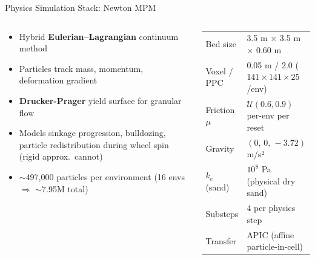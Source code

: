 \documentclass[aspectratio=169, 10pt]{beamer}
\newcommand{\keyword}[1]{\textbf{\color{MarsLight}#1}}
\newcommand{\teal}[1]{{\color{ArcticTeal}#1}}
\begin{document}
\begin{frame}{Physics Simulation Stack: Newton MPM}
\begin{columns}[T]
\begin{tcolorbox}[mycard, title={\faAtom\; Material Point Method (MPM)}]
  \scriptsize
  \begin{itemize}[leftmargin=1em, itemsep=2pt]
    \item Hybrid \keyword{Eulerian–Lagrangian} continuum method
    \item Particles track mass, momentum, deformation gradient
    \item \keyword{Drucker-Prager} yield surface for granular flow
    \item Models sinkage progression, bulldozing, particle
      redistribution during wheel spin (rigid approx.\ cannot)
    \item \teal{$\sim$497,000 particles per environment} (16 envs $\Rightarrow$ $\sim$7.95M total)
  \end{itemize}
\end{tcolorbox}

\vspace{-0.7em}
\begin{tcolorbox}[mycard, title={\faCubes\; Sand Bed Configuration}]
  \scriptsize
  \setlength{\tabcolsep}{3pt}\renewcommand{\arraystretch}{0.95}
  \begin{tabular}{@{}ll@{}}
    Bed size     & 3.5 m $\times$ 3.5 m $\times$ 0.60 m \\
    Voxel / PPC  & 0.05 m / 2.0 ($141{\times}141{\times}25$/env) \\
    Friction $\mu$ & $\mathcal{U}(0.6, 0.9)$ per-env per reset \\
    Gravity      & $(0,\, 0,\, -3.72)$ m/s² \\
    $k_e$ (sand) & $10^{8}$ Pa (physical dry sand) \\
    Substeps     & 4 per physics step \\
    Transfer     & APIC (affine particle-in-cell) \\
  \end{tabular}
\end{tcolorbox}


\end{columns}
\end{frame}
\end{document}
